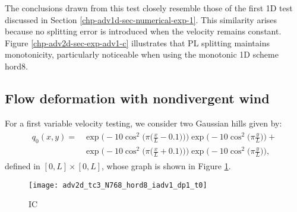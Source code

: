 The conclusions drawn from this test closely resemble those of the first 1D test discussed in Section \ref{chp-adv1d-sec-numerical-exp-1}.
This similarity arises because no splitting error is introduced when the velocity remains constant.
Figure \ref{chp-adv2d-sec-exp-adv1-c} illustrates that PL splitting maintains monotonicity, particularly noticeable when using the monotonic 1D scheme hord8.

\subsection{Flow deformation with nondivergent wind}
For a first variable velocity testing, we consider two Gaussian hills given by:
\begin{align}
	\begin{split}
	\label{chp-adv2d-ic2}
	q_0(x,y) = &\exp\bigg(-10\cos^2 \bigg(\pi \bigg(\frac{x}{L}-0.1\bigg)\bigg)\bigg) \exp\bigg(-10\cos^2 \bigg(\pi \frac{y}{L}\bigg) \bigg)+ \\
	           &\exp\bigg(-10\cos^2 \bigg(\pi \bigg(\frac{x}{L}+0.1\bigg)\bigg)\bigg) \exp\bigg(-10\cos^2 \bigg(\pi \frac{y}{L}\bigg) \bigg),
	\end{split}
\end{align}
defined in $[0,L] \times [0,L]$, whose graph is shown in Figure \ref{chp-adv2d-sec-exp-adv2-ic}.
\begin{figure}[!htb]
	\centering
	\texttt{[image: adv2d\_tc3\_N768\_hord8\_iadv1\_dp1\_t0]}
	\caption{IC\label{chp-adv2d-sec-exp-adv2-ic}}
\end{figure}

